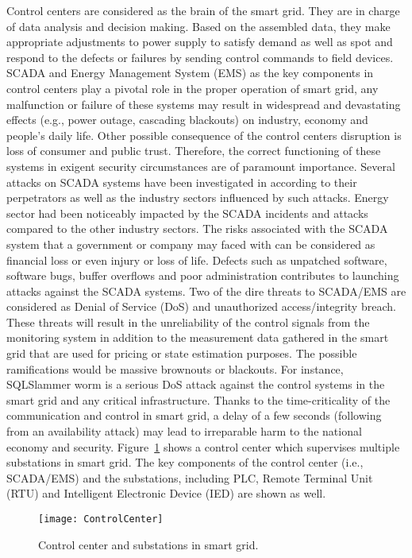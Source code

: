 \documentclass[preprint,number,12pt]{elsarticle}
\begin{document}
Control centers are considered as the brain of the smart grid\citep{Zeng2012}. They are in charge of data analysis and decision making\citep{Chen2012}. Based on the assembled data, they make appropriate adjustments to power supply to satisfy demand as well as spot and respond to the defects or failures by sending control commands to field devices\citep{Li2012}. SCADA and Energy Management System (EMS) as the key components in control centers play a pivotal role in the proper operation of smart grid, any malfunction or failure of these systems may result in widespread and devastating effects (e.g., power outage, cascading blackouts) on industry, economy and people's daily life. Other possible consequence of the control centers disruption is loss of consumer and public trust\citep{Zeng2012}. Therefore, the correct functioning of these systems in exigent security circumstances are of paramount importance. Several attacks on SCADA systems have been investigated in\citep{Nicholson2012418} according to their perpetrators as well as the industry sectors influenced by such attacks. Energy sector had been noticeably impacted by the SCADA incidents and attacks compared to the other industry sectors. The risks associated with the SCADA system that a government or company may faced with can be considered as financial loss or even injury or loss of life. Defects such as unpatched software, software bugs, buffer overflows and poor administration contributes to launching attacks against  the SCADA systems. Two of the dire threats to SCADA/EMS are considered as Denial of Service (DoS) and unauthorized access/integrity breach\citep{Nicholson2012418}. These threats will result in the unreliability of the control signals from the monitoring system in addition to the measurement data gathered in the smart grid that are used for pricing or state estimation purposes. The possible ramifications would be massive brownouts or blackouts. For instance, SQLSlammer worm  is a serious DoS attack against the control systems in the smart grid and any critical infrastructure. Thanks to the time-criticality of the communication and control in smart grid, a delay of a few seconds (following from an availability attack) may lead to irreparable harm to the national economy and security\citep{Li2012}. Figure~\ref{fig:ControlCenter} shows a control center which supervises multiple substations in smart grid\citep{Wei2011c}. The key components of the control center (i.e., SCADA/EMS) and the substations, including PLC, Remote Terminal Unit (RTU) and Intelligent Electronic Device (IED) are shown as well.
\begin{figure}[!t]
\centering
\texttt{[image: ControlCenter]}
\caption{Control center and substations in smart grid.}
\label{fig:ControlCenter}
\end{figure}
\end{document}
